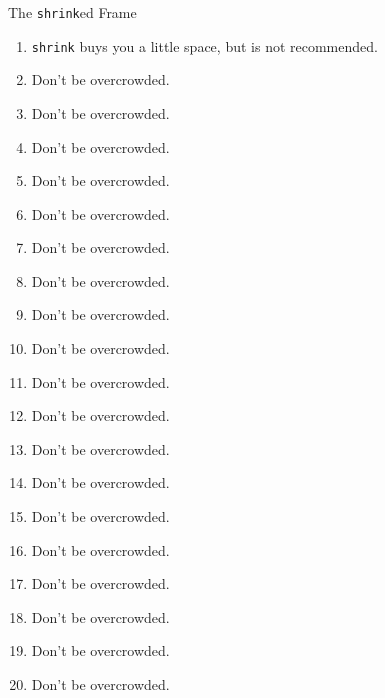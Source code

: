 \documentclass[
        handout,
        ]{beamer}
\begin{document}
\begin{frame}[shrink]{The \texttt{shrink}ed Frame} %
    \begin{enumerate}
    \item \texttt{shrink} buys you a little space, but is not recommended.
    \item Don't be overcrowded.
    \item Don't be overcrowded.
    \item Don't be overcrowded.
    \item Don't be overcrowded.

    \item Don't be overcrowded.
    \item Don't be overcrowded.
    \item Don't be overcrowded.
    \item Don't be overcrowded.
    \item Don't be overcrowded.
    
    \item Don't be overcrowded.
    \item Don't be overcrowded.
    \item Don't be overcrowded.
    \item Don't be overcrowded.
    \item Don't be overcrowded.
    
    \item Don't be overcrowded.
    \item Don't be overcrowded.
    \item Don't be overcrowded.
    \item Don't be overcrowded.
    \item Don't be overcrowded.
    \end{enumerate}
\end{frame}
\end{document}

